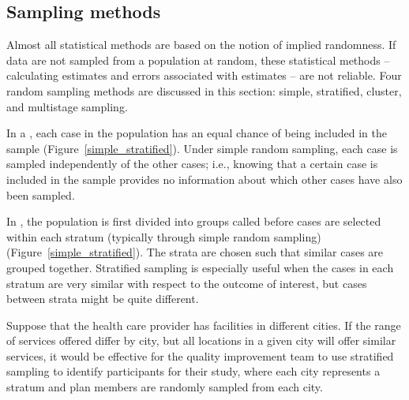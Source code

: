 
\newpage

\subsection{Sampling methods}


\label{fourSamplingMethods}
\label{threeSamplingMethods}

Almost all statistical methods are based on the notion of implied randomness. If data are not sampled from a population at random, these statistical methods -- calculating estimates and errors associated with estimates -- are not reliable. Four random sampling methods are discussed in this section: simple, stratified, cluster, and multistage sampling.

In a , each case in the population has an equal chance of being included in the sample (Figure~\ref{simple_stratified}). Under simple random sampling, each case is sampled independently of the other cases; i.e., knowing that a certain case is included in the sample provides no information about which other cases have also been sampled. 

In , the population is first divided into groups called  before cases are selected within each stratum (typically through simple random sampling) (Figure~\ref{simple_stratified}). The strata are chosen such that similar cases are grouped together. Stratified sampling is especially useful when the cases in each stratum are very similar with respect to the outcome of interest, but cases between strata might be quite different. 

Suppose that the health care provider has facilities in different cities. If the range of services offered differ by city, but all locations in a given city will offer similar services, it would be effective for the quality improvement team to use stratified sampling to identify participants for their study, where each city represents a stratum and plan members are randomly sampled from each city.


